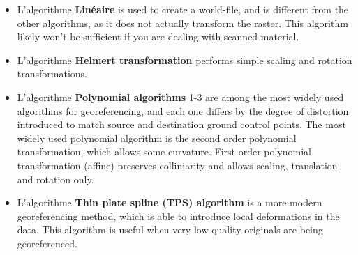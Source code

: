 \begin{itemize}[label=--]
\item L'algorithme \textbf{Linéaire}  is used to create a world-file, and is different  from the other algorithms, as it does not actually transform the raster.  This algorithm likely won't be sufficient if you are dealing with scanned  material.
\item L'algorithme \textbf{Helmert transformation} performs simple scaling and rotation  transformations.
\item L'algorithme \textbf{Polynomial algorithms} 1-3 are among the most widely  used algorithms  for georeferencing, and each one differs by the degree of distortion  introduced to match source and destination ground control points. The  most widely used polynomial algorithm is the second order polynomial  transformation, which allows some curvature. First order polynomial  transformation (affine) preserves colliniarity and allows scaling,  translation and rotation only.
\item L'algorithme \textbf{Thin plate spline (TPS) algorithm} is a more  modern georeferencing  method, which is able to introduce local  deformations in the data. This algorithm is useful when very low  quality originals are being georeferenced.
\end{itemize}

